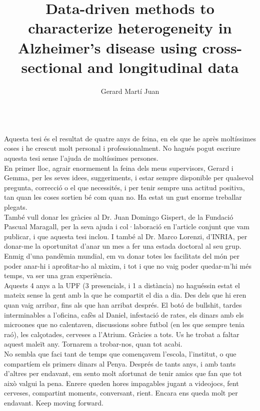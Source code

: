 \documentclass[12pt, b5paper,twoside]{tesi_upf}
\title{Data-driven methods to characterize heterogeneity in Alzheimer’s disease using cross-sectional and longitudinal data}
\author{Gerard Martí Juan}
\begin{document}
\frontmatter
\maketitle

\cleardoublepage





 \\
Aquesta tesi és el resultat de quatre anys de feina, en els que he après moltíssimes coses i he crescut molt personal i professionalment. No hagués pogut escriure aquesta tesi sense l'ajuda de moltíssimes persones. \\

En primer lloc, agrair enormement la feina dels meus supervisors, Gerard i Gemma, per les seves idees, suggeriments, i estar sempre disponible per qualsevol pregunta, correcció o el que necessités, i per tenir sempre una actitud positiva, tan quan les coses sortien bé com quan no. Ha estat un gust enorme treballar plegats. \\

També vull donar les gràcies al Dr. Juan Domingo Gispert, de la Fundació Pascual Maragall, per la seva ajuda i col·laboració en l'article conjunt que vam publicar, i que aquesta tesi inclou. I també al Dr. Marco Lorenzi, d'INRIA, per donar-me la oportunitat d'anar un mes a fer una estada doctoral al seu grup. Enmig d'una pandèmia mundial, em va donar totes les facilitats del món per poder anar-hi i aprofitar-ho al màxim, i tot i que no vaig poder quedar-m'hi més temps, va ser una gran experiència. \\

Aquests 4 anys a la UPF (3 presencials, i 1 a distància) no haguéssin estat el mateix sense la gent amb la que he compartit el dia a dia. Des dels que hi eren quan vaig arribar, fins als que han arribat després. El botó de bullshit, tardes interminables a l'oficina, cafès al Daniel, infestació de rates, els dinars amb els microones que no calentaven, discussions sobre futbol (en les que sempre tenia raó), les calçotades, cerveses a l'Atrium. Gràcies a tots. Us he trobat a faltar aquest maleït any. Tornarem a trobar-nos, quan tot acabi. \\

No sembla que faci tant de temps que començavem l'escola, l'institut, o que compartíem els primers dinars al Penya. Després de tants anys, i amb tants d'altres per endavant, em sento molt afortunat de tenir amics que fan que tot això valgui la pena. Enrere queden hores impagables jugant a videojocs, fent cerveses, compartint moments, conversant, rient. Encara ens queda molt per endavant. Keep moving forward. \\
\end{document}
